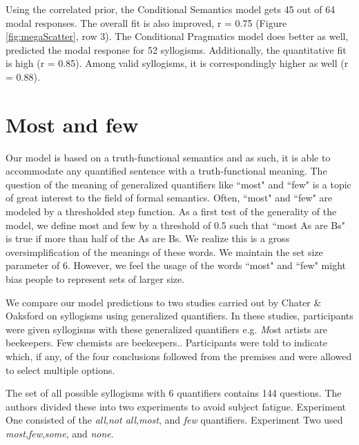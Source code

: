 \documentclass[10pt,letterpaper]{article}
\begin{document}
Using the correlated prior, the Conditional Semantics model gets 45 out of 64 modal responses. The overall fit is also improved, r = 0.75 (Figure \ref{fig:megaScatter}, row 3). The Conditional Pragmatics model does better as well, predicted the modal response for 52 syllogisms. Additionally, the quantitative fit is high (r = 0.85). Among valid syllogisms, it is correspondingly higher as well (r = 0.88). 


\section{Most and few}

Our model is based on a truth-functional semantics and as such, it is able to accommodate any quantified sentence with a truth-functional meaning. The question of the meaning of generalized quantifiers like ``most" and ``few" is a topic of great interest to the field of formal semantics. Often, ``most" and ``few" are modeled by a thresholded step function. As a first test of the generality of the model, we define most and few by a threshold of 0.5 such that ``most As are Bs" is true if more than half of the As are Bs. We realize this is a gross oversimplification of the meanings of these words. We maintain the set size parameter of 6. However, we feel the usage of the words ``most" and ``few" might bias people to represent sets of larger size.

We compare our model predictions to two studies carried out by Chater \& Oaksford on syllogisms using generalized quantifiers. In these studies, participants were given syllogisms with these generalized quantifiers e.g. {\emph Most artists are beekeepers. Few chemists are beekeepers.}. Participants were told to indicate which, if any, of the four conclusions followed from the premises and were allowed to select multiple options.

The set of all possible syllogisms with 6 quantifiers contains 144 questions.  The authors divided these into two experiments to avoid subject fatigue. Experiment One consisted of the \emph{all},\emph{not all},\emph{most}, and \emph{few} quantifiers. Experiment Two used \emph{most},\emph{few},\emph{some}, and \emph{none}. 
\end{document}

